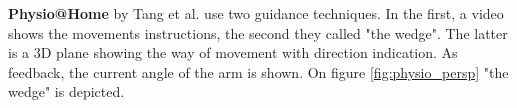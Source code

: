 \textbf{Physio@Home} by Tang et al. \cite{Tang2015} use two guidance techniques. In the first, a video shows the movements instructions, the second they called "the wedge". The latter is a 3D plane showing the way of movement with direction indication. As feedback, the current angle of the arm is shown. On figure \ref{fig:physio_persp} "the wedge" is depicted.


